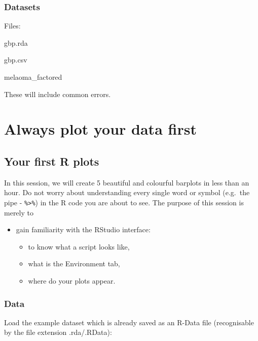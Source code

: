 \documentclass[]{book}
\makeatletter
\providecommand{\tightlist}{%
  \setlength{\itemsep}{0pt}\setlength{\parskip}{0pt}}
\newenvironment{kframe}{%
\medskip{}
\setlength{\fboxsep}{.8em}
 \def\at@end@of@kframe{}%
 \ifinner\ifhmode%
  \def\at@end@of@kframe{\end{minipage}}%
  \begin{minipage}{\columnwidth}%
 \fi\fi%
 \def\FrameCommand##1{\hskip\@totalleftmargin \hskip-\fboxsep
 \colorbox{shadecolor}{##1}\hskip-\fboxsep
     \hskip-\linewidth \hskip-\@totalleftmargin \hskip\columnwidth}%
 \MakeFramed {\advance\hsize-\width
   \@totalleftmargin\z@ \linewidth\hsize
   \@setminipage}}%
 {\par\unskip\endMakeFramed%
 \at@end@of@kframe}
\newenvironment{rmdblock}[1]
  {
  \begin{itemize}
  \renewcommand{\labelitemi}{
    \raisebox{-.7\height}[0pt][0pt]{
      {\setkeys{Gin}{width=3em,keepaspectratio}\texttt{[image: images/\#1]}}
    }
  }
  \setlength{\fboxsep}{1em}
  \begin{kframe}
  \item
  }
  {
  \end{kframe}
  \end{itemize}
  }
\newenvironment{healthyr}
  {\begin{rmdblock}{cover}}
  {\end{rmdblock}}
\newenvironment{error}
  {\begin{rmdblock}{error}}
  {\end{rmdblock}}
\makeatother
\begin{document}
\section{Datasets}\label{datasets}

\begin{healthyr}
Files:

gbp.rda

gbp.csv

melaoma\_factored
\end{healthyr}

\begin{error}
These will include common errors.
\end{error}

\part{Always plot your data
first}\label{part-always-plot-your-data-first}

\chapter{Your first R plots}\label{your-first-r-plots}

In this session, we will create 5 beautiful and colourful barplots in
less than an hour. Do not worry about understanding every single word or
symbol (e.g.~the pipe - \texttt{\%\textgreater{}\%}) in the R code you
are about to see. The purpose of this session is merely to

\begin{itemize}
\tightlist
\item
  gain familiarity with the RStudio interface:

  \begin{itemize}
  \tightlist
  \item
    to know what a script looks like,
  \item
    what is the Environment tab,
  \item
    where do your plots appear.
  \end{itemize}
\end{itemize}

\section{Data}\label{data}

Load the example dataset which is already saved as an R-Data file
(recognisable by the file extension .rda/.RData):
\end{document}
